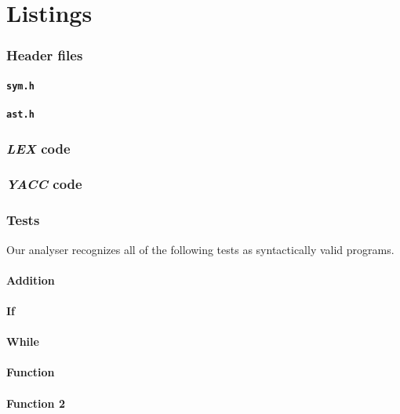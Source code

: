 \documentclass[a4paper,12pt,notitlepage,english]{article}
\begin{document}
	\newpage\appendix\part*{Listings}

	\section*{Header files}

	\subsection*{\texttt{sym.h}}\label{sec:lst-sym}

	

	\subsection*{\texttt{ast.h}}\label{sec:lst-ast}

	

	\section*{\emph{LEX} code}

	

	\section*{\emph{YACC} code}\label{sec:lst-yacc}

	

	\newpage\section*{Tests}

	Our analyser recognizes all of the following tests as syntactically valid programs.

	\subsection*{Addition}

	

	\subsection*{If}

	

	\subsection*{While}

	

	\subsection*{Function}

	

	\subsection*{Function 2}

	
\end{document}
